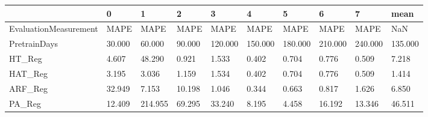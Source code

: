 \begin{tabular}{llllllllll}
\toprule
{} &      0 &       1 &      2 &       3 &       4 &       5 &       6 &       7 &    mean \\
\midrule
EvaluationMeasurement &   MAPE &    MAPE &   MAPE &    MAPE &    MAPE &    MAPE &    MAPE &    MAPE &     NaN \\
PretrainDays          & 30.000 &  60.000 & 90.000 & 120.000 & 150.000 & 180.000 & 210.000 & 240.000 & 135.000 \\
HT\_Reg                &  4.607 &  48.290 &  0.921 &   1.533 &   0.402 &   0.704 &   0.776 &   0.509 &   7.218 \\
HAT\_Reg               &  3.195 &   3.036 &  1.159 &   1.534 &   0.402 &   0.704 &   0.776 &   0.509 &   1.414 \\
ARF\_Reg               & 32.949 &   7.153 & 10.198 &   1.046 &   0.344 &   0.663 &   0.817 &   1.626 &   6.850 \\
PA\_Reg                & 12.409 & 214.955 & 69.295 &  33.240 &   8.195 &   4.458 &  16.192 &  13.346 &  46.511 \\
\bottomrule
\end{tabular}
